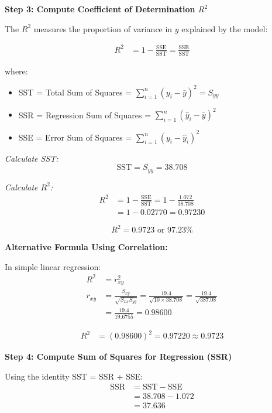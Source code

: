 \documentclass[12pt]{article}
\begin{document}
\begin{solution}
\textbf{Step 3: Compute Coefficient of Determination $R^2$}

The $R^2$ measures the proportion of variance in $y$ explained by the model:

\begin{align*}
R^2 &= 1 - \frac{\text{SSE}}{\text{SST}} = \frac{\text{SSR}}{\text{SST}}
\end{align*}

where:
\begin{itemize}
    \item SST = Total Sum of Squares = $\sum_{i=1}^{n}(y_i - \bar{y})^2 = S_{yy}$
    \item SSR = Regression Sum of Squares = $\sum_{i=1}^{n}(\hat{y}_i - \bar{y})^2$
    \item SSE = Error Sum of Squares = $\sum_{i=1}^{n}(y_i - \hat{y}_i)^2$
\end{itemize}

\textit{Calculate SST:}
\[
\text{SST} = S_{yy} = 38.708
\]

\textit{Calculate $R^2$:}
\begin{align*}
R^2 &= 1 - \frac{\text{SSE}}{\text{SST}} = 1 - \frac{1.072}{38.708} \\
&= 1 - 0.02770 = 0.97230
\end{align*}

\[
\boxed{R^2 = 0.9723 \text{ or } 97.23\%}
\]

\textbf{Alternative Formula Using Correlation:}

In simple linear regression:
\begin{align*}
R^2 &= r_{xy}^2 \\
r_{xy} &= \frac{S_{xy}}{\sqrt{S_{xx}S_{yy}}} = \frac{19.4}{\sqrt{10 \times 38.708}} = \frac{19.4}{\sqrt{387.08}} \\
&= \frac{19.4}{19.6755} = 0.98600
\end{align*}

\begin{align*}
R^2 &= (0.98600)^2 = 0.97220 \approx 0.9723
\end{align*}

\textbf{Step 4: Compute Sum of Squares for Regression (SSR)}

Using the identity SST = SSR + SSE:
\begin{align*}
\text{SSR} &= \text{SST} - \text{SSE} \\
&= 38.708 - 1.072 \\
&= 37.636
\end{align*}


\end{solution}
\end{document}
